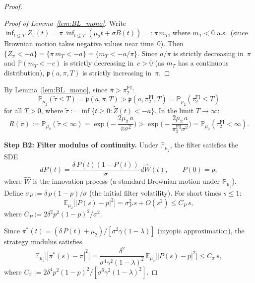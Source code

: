 \documentclass[12pt]{article}
\theoremstyle{remark}
\theoremstyle{definition}
\newcommand{\E}{\mathbb{E}}
\newcommand{\Prob}{\mathbb{P}}
\newcommand{\FI}{\mathrm{FI}}
\begin{document}
\begin{proof}
\begin{proof}[Proof of Lemma~\ref{lem:BL_mono}]
Write $\inf_{t \le T} Z_\pi(t) = \pi\,\inf_{t \le T}(\mu_2 t + \sigma B(t))
=: \pi\,m_T$, where $m_T < 0$ a.s.\
(since Brownian motion takes negative values near time~0).
Then
$\{Z_\pi < -a\} = \{\pi\,m_T < -a\} = \{m_T < -a/\pi\}$.
Since $a/\pi$ is strictly decreasing in~$\pi$ and $\Prob(m_T < -c)$ is
strictly decreasing in~$c > 0$ (as $m_T$ has a continuous distribution),
$\mathfrak{p}(a, \pi, T)$ is strictly increasing in~$\pi$.
\end{proof}

By Lemma~\ref{lem:BL_mono}, since $\bar{\pi} > \pi_2^{\FI}$:
\begin{equation}\label{eq:BL_comparison}
  \Prob_{\mu_2}(\widetilde{\tau} \le T)
  = \mathfrak{p}(a, \bar{\pi}, T)
  > \mathfrak{p}(a, \pi_2^{\FI}, T)
  = \Prob_{\mu_2}(\tau_2^{\FI} \le T)
\end{equation}
for all $T > 0$, where $\widetilde{\tau} := \inf\{t \ge 0 :
\widetilde{Z}(t) < -a\}$.
In the limit $T \to \infty$:
\begin{equation}\label{eq:R_barpi_proof}
  R(\bar{\pi}) := \Prob_{\mu_2}(\widetilde{\tau} < \infty)
  = \exp\!\biggl(-\frac{2\mu_2\,a}{\bar{\pi}\sigma^2}\biggr)
  > \exp\!\biggl(-\frac{2\mu_2\,a}{\pi_2^{\FI}\sigma^2}\biggr)
  = \Prob_{\mu_2}(\tau_2^{\FI} < \infty).
\end{equation}

\medskip\noindent\textbf{Step B2: Filter modulus of continuity.}
Under $\Prob_{\mu_2}$, the filter satisfies the SDE
\begin{equation}\label{eq:filter_SDE_bad}
  dP(t) = \frac{\delta\,P(t)(1-P(t))}{\sigma}\,d\widehat{W}(t),
  \qquad P(0) = p,
\end{equation}
where $\widehat{W}$ is the innovation process (a standard Brownian motion
under $\Prob_{\mu_2}$).
Define $\sigma_P := \delta\,p(1-p)/\sigma$ (the initial filter volatility).
For short times $s \le 1$:
\begin{equation}\label{eq:filter_L2_proof}
  \E_{\mu_2}\bigl[|P(s) - p|^2\bigr]
  = \sigma_P^2\,s + O(s^2)
  \le C_P\,s,
\end{equation}
where $C_P := 2\delta^2 p^2(1-p)^2/\sigma^2$.

Since $\pi^*(t) = (\delta\,P(t) + \mu_2)/[\sigma^2\gamma(1-\lambda)]$
(myopic approximation), the strategy modulus satisfies
\begin{equation}\label{eq:pi_L2_proof}
  \E_{\mu_2}\bigl[|\pi^*(s) - \bar{\pi}|^2\bigr]
  = \frac{\delta^2}{\sigma^4\gamma^2(1-\lambda)^2}\,
    \E_{\mu_2}\bigl[|P(s) - p|^2\bigr]
  \le C_\pi\,s,
\end{equation}
where $C_\pi := 2\delta^4 p^2(1-p)^2/[\sigma^6\gamma^2(1-\lambda)^2]$.


\end{proof}
\end{document}
